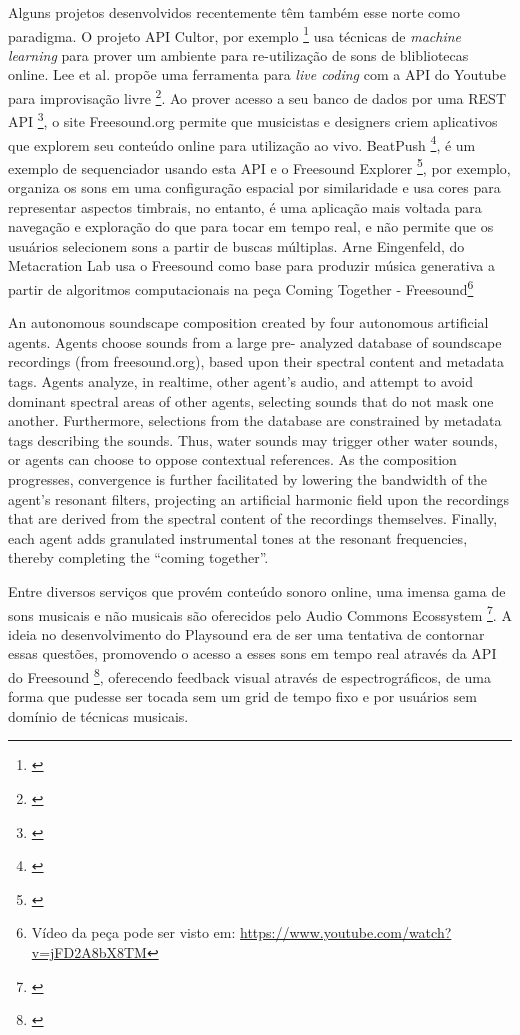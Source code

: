 Alguns projetos desenvolvidos recentemente têm também esse norte como paradigma. O projeto API Cultor, por exemplo \footnote{\cite{Ordiales2017}} usa técnicas de \emph{machine learning} para prover um ambiente para re-utilização de sons de blibliotecas online. Lee et al. propõe uma ferramenta para \emph{live coding} com a API do Youtube para improvisação livre \footnote{\cite{Lee}}. Ao prover acesso a seu banco de dados por uma REST API \footnote{\cite{Akkermans2011}}, o site Freesound.org permite que musicistas e designers criem aplicativos que explorem seu conteúdo online para utilização ao vivo. BeatPush \footnote{\cite{Feenstra2016}}, é um exemplo de sequenciador usando esta API e o Freesound Explorer \footnote{\cite{Font2016}}, por exemplo, organiza os sons em uma configuração espacial por similaridade e usa cores para representar aspectos timbrais, no entanto, é uma aplicação mais voltada para navegação e exploração do que para tocar em tempo real, e não permite que os usuários selecionem sons a partir de buscas múltiplas. 
Arne Eingenfeld, do Metacration Lab usa o Freesound como base para produzir música generativa a partir de algoritmos computacionais na peça Coming Together - Freesound\footnote{Vídeo da peça pode ser visto em: \url{https://www.youtube.com/watch?v=jFD2A8bX8TM}}

\begin{citacao}
An autonomous soundscape composition created by four autonomous artificial agents. Agents choose sounds from a large pre- analyzed database of soundscape recordings (from freesound.org), based upon their spectral content and metadata tags. Agents analyze, in realtime, other agent's audio, and attempt to avoid dominant spectral areas of other agents, selecting sounds that do not mask one another. Furthermore, selections from the database are constrained by metadata tags describing the sounds. Thus, water sounds may trigger other water sounds, or agents can choose to oppose contextual references. As the composition progresses, convergence is further facilitated by lowering the bandwidth of the agent's resonant filters, projecting an artificial harmonic field upon the recordings that are derived from the spectral content of the recordings themselves. Finally, each agent adds granulated instrumental tones at the resonant frequencies, thereby completing the ``coming together''. \cite{Arneeigenfeldt2010}
\end{citacao}

Entre diversos serviços que provém conteúdo sonoro online, uma imensa gama de sons musicais e não musicais são oferecidos pelo Audio Commons Ecossystem \footnote{\cite{Font2015}}. A ideia no desenvolvimento do Playsound era de ser uma tentativa de contornar essas questões, promovendo o acesso a esses sons em tempo real através da API do Freesound \footnote{\cite{Akkermans2011}}, oferecendo feedback visual através de espectrográficos, de uma forma que pudesse ser tocada sem um grid de tempo fixo e por usuários sem domínio de técnicas musicais.


